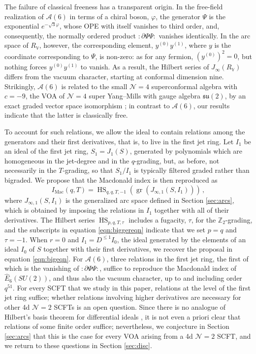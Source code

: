 \documentclass[12pt]{article}
\numberwithin{equation}{section}
\numberwithin{figure}{section}
\theoremstyle{plain}
\theoremstyle{definition}
\begin{document}
The failure of classical freeness has a transparent origin. In the free-field realization of $\mathcal{A}(6)$ in terms of a chiral boson, $\varphi$, the generator $\Psi$ is the exponential $e^{-\sqrt{3}\varphi}$, whose OPE with itself vanishes to third order, and, consequently, the normally ordered product ${:}\partial\Psi\Psi{:}$ vanishes identically. In the arc space of $R_\mathbb{V}$, however, the corresponding element, $y^{(0)} y^{(1)}$, where $y$ is the coordinate corresponding to $\Psi$, is non-zero: as for any fermion, $(y^{(0)})^2 = 0$, but nothing forces $y^{(0)} y^{(1)}$ to vanish. As a result, the Hilbert series of $J_\infty(R_\mathbb{V})$ differs from the vacuum character, starting at conformal dimension nine. Strikingly, $\mathcal{A}(6)$ is related to the small $\mathcal{N}=4$ superconformal algebra with $c = -9$, the VOA of $\mathcal{N}=4$ super Yang--Mills with gauge algebra $\mathfrak{su}(2)$, by an exact graded vector space isomorphism \cite{Buican:2020moo}; in contrast to $\mathcal{A}(6)$, our results indicate that the latter is classically free.

To account for such relations, we allow the ideal to contain relations among the generators and their first derivatives, that is, to live in the first jet ring. Let $I_1$ be an ideal of the first jet ring, $S_1 = J_1(S)$, generated by polynomials which are homogeneous in the jet-degree and in the $q$-grading, but, as before, not necessarily in the $T$-grading, so that $S_1 / I_1$ is typically filtered graded rather than bigraded. We propose that the Macdonald index is then reproduced as
\begin{equation}\label{eqn:biggereqn}
    I_\text{Mac}(q, T) = \operatorname{HS}_{q,q,T,-1}(\operatorname{gr}(J_{\infty,1}(S, I_1))) \,,
\end{equation}
where $J_{\infty,1}(S, I_1)$ is the generalized arc space defined in Section \ref{sec:arcs}, which is obtained by imposing the relations in $I_1$ together with all of their derivatives. The Hilbert series $\operatorname{HS}_{p,q,T,\tau}$ includes a fugacity, $\tau$, for the $\mathbb{Z}_2$-grading, and the subscripts in equation \eqref{eqn:biggereqn} indicate that we set $p = q$ and $\tau = -1$. When $r = 0$ and $I_1 = D^{\leq 1}I_0$, the ideal generated by the elements of an ideal $I_0$ of $S$ together with their first derivatives, we recover the proposal in equation \eqref{eqn:bigeqn}. For $\mathcal{A}(6)$, three relations in the first jet ring, the first of which is the vanishing of ${:}\partial\Psi\Psi{:}$, suffice to reproduce the Macdonald index of $\widehat{E}_6(SU(2))$, and thus also the vacuum character, up to and including order $q^{51}$. For every SCFT that we study in this paper, relations at the level of the first jet ring suffice; whether relations involving higher derivatives are necessary for other 4d $\mathcal{N}=2$ SCFTs is an open question. Since there is no analogue of Hilbert's basis theorem for differential ideals \cite{Ritt,Kolchin}, it is not even a priori clear that relations of some finite order suffice; nevertheless, we conjecture in Section \ref{sec:arcs} that this is the case for every VOA arising from a 4d $\mathcal{N}=2$ SCFT, and we return to these questions in Section \ref{sec:disc}.
\end{document}
